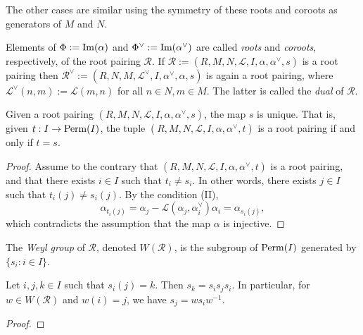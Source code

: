 \begin{example}
    The other cases are similar using the symmetry of these roots and coroots as generators of $M$ and $N$.
\end{example}


Elements of $\Phi := {\rm Im}(\alpha)$ and $\Phi^\vee := {\rm Im}(\alpha^\vee)$ are called {\it roots} and {\it coroots}, 
respectively, of the root pairing $\mathcal{R}$. If $\mathcal{R} := (R,M,N,\mathcal{L},I,\alpha, \alpha^\vee,s)$ is 
a root pairing then $\mathcal{R}^\vee := (R,N,M,\mathcal{L}^\vee,I,\alpha^\vee, \alpha,s)$ is again 
a root pairing, where $\mathcal{L}^\vee (n,m) := \mathcal{L}(m,n)$ for all $n \in N,m \in M$. The 
latter is called the {\it dual} of $\mathcal{R}$. 

\begin{lemma}
    Given a root pairing $(R,M,N,\mathcal{L},I,\alpha, \alpha^\vee, s)$, the map $s$ is unique. 
    That is, given $t : I \to {\rm Perm}(I)$, the tuple $(R,M,N,\mathcal{L},I,\alpha, \alpha^\vee, t)$
    is a root pairing if and only if $t = s$.
\end{lemma}
\begin{proof}
    Assume to the contrary that $(R,M,N,\mathcal{L},I,\alpha, \alpha^\vee, t)$ is a root pairing, and that 
    there exists $i \in I$ such that $t_i \neq s_i$. In other words, there exists $j \in I$ such that
    $t_i(j) \neq s_i(j)$. By the condition (II),
    \[
        \alpha_{t_i(j)} = \alpha_j - \mathcal{L}(\alpha_j,\alpha^\vee_i)\alpha_i = \alpha_{s_i(j)},
    \]
    which contradicts the assumption that the map $\alpha$ is injective.
\end{proof}


\begin{definition}
    The {\it Weyl group} of $\mathcal{R}$, denoted $W(\mathcal{R})$, is the subgroup of ${\rm Perm}(I)$ 
    generated by $\{s_i : i \in I\}$. 
\end{definition}
\begin{lemma}
    Let $i,j,k \in I$ such that $s_i(j) = k$. Then $s_k = s_is_js_i$. In particular, for 
    $w \in W(\mathcal{R})$ and $w(i) = j$, we have $s_j = ws_iw^{-1}$. 
\end{lemma}
\begin{proof}

\end{proof}

